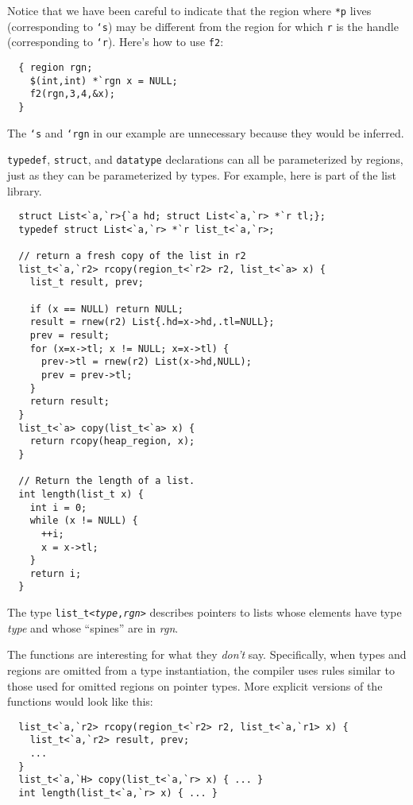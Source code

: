Notice that we have been careful to indicate that the region where
\texttt{*p} lives (corresponding to \texttt{`s}) may be different from
the region for which \texttt{r} is the handle (corresponding to
\texttt{`r}).  Here's how to use \texttt{f2}:
\begin{verbatim}
  { region rgn;
    $(int,int) *`rgn x = NULL; 
    f2(rgn,3,4,&x);
  }
\end{verbatim} %
The \texttt{`s} and \texttt{`rgn} in our example are unnecessary
because they would be inferred.

\texttt{typedef}, \texttt{struct}, and \texttt{datatype}
declarations can all be parameterized by regions,
just as they can be parameterized by types.  For example, here is part
of the list library.
\begin{verbatim}
  struct List<`a,`r>{`a hd; struct List<`a,`r> *`r tl;};
  typedef struct List<`a,`r> *`r list_t<`a,`r>;

  // return a fresh copy of the list in r2
  list_t<`a,`r2> rcopy(region_t<`r2> r2, list_t<`a> x) {
    list_t result, prev;

    if (x == NULL) return NULL;
    result = rnew(r2) List{.hd=x->hd,.tl=NULL};
    prev = result;
    for (x=x->tl; x != NULL; x=x->tl) {
      prev->tl = rnew(r2) List(x->hd,NULL);
      prev = prev->tl;
    }
    return result;
  }  
  list_t<`a> copy(list_t<`a> x) {
    return rcopy(heap_region, x);
  }

  // Return the length of a list. 
  int length(list_t x) {
    int i = 0;
    while (x != NULL) {
      ++i;
      x = x->tl;
    }
    return i;
  }
\end{verbatim}
The type \texttt{list\_t<\textit{type},\textit{rgn}>} describes
pointers to lists whose elements have type \textit{type} and whose
``spines'' are in \textit{rgn}.  

The functions are interesting for what they \emph{don't} say.
Specifically, when types and regions are omitted from a type
instantiation, the compiler uses rules similar to those used for
omitted regions on pointer types.  More explicit versions of the
functions would look like this:
\begin{verbatim}
  list_t<`a,`r2> rcopy(region_t<`r2> r2, list_t<`a,`r1> x) {
    list_t<`a,`r2> result, prev;
    ...
  }
  list_t<`a,`H> copy(list_t<`a,`r> x) { ... }
  int length(list_t<`a,`r> x) { ... }
\end{verbatim}


